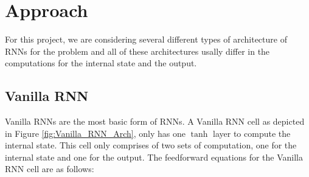 \documentclass[letterpaper, 12 pt, conference]{ieeeconf}  %
\begin{document}





\section{\textbf{Approach}}



For this project, we are considering several different types of architecture of RNNs for the problem and all of these architectures usally differ in the computations for the internal state and the output.

\subsection{Vanilla RNN}
Vanilla RNNs are the most basic form of RNNs. A Vanilla RNN cell as depicted in Figure \ref{fig:Vanilla_RNN_Arch}, only has one $\tanh$ layer to compute the internal state. This cell only comprises of two sets of computation, one for the internal state and one for the output. The feedforward equations for the Vanilla RNN cell are as follows:
\end{document}
